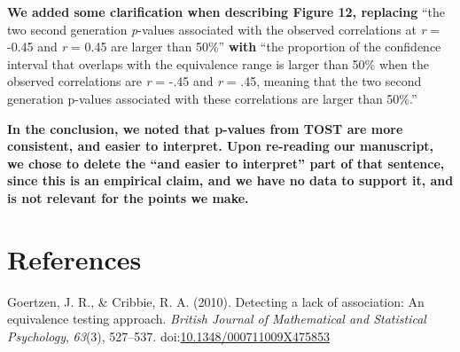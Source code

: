 \documentclass[man]{apa6}
\begin{document}
\textbf{We added some clarification when describing Figure 12, replacing} \enquote{the two second generation \emph{p}-values associated with the observed correlations at \emph{r} = -0.45 and \emph{r} = 0.45 are larger than 50\%} \textbf{with} \enquote{the proportion of the confidence interval that overlaps with the equivalence range is larger than 50\% when the observed correlations are \emph{r} = -.45 and \emph{r} = .45, meaning that the two second generation p-values associated with these correlations are larger than 50\%.}

\textbf{In the conclusion, we noted that p-values from TOST are more consistent, and easier to interpret. Upon re-reading our manuscript, we chose to delete the \enquote{and easier to interpret} part of that sentence, since this is an empirical claim, and we have no data to support it, and is not relevant for the points we make.}

\newpage

\hypertarget{references}{%
\section{References}\label{references}}

\begingroup
\setlength{\parindent}{-0.5in}
\setlength{\leftskip}{0.5in}

\hypertarget{refs}{}
\leavevmode\hypertarget{ref-goertzen_detecting_2010}{}%
Goertzen, J. R., \& Cribbie, R. A. (2010). Detecting a lack of association: An equivalence testing approach. \emph{British Journal of Mathematical and Statistical Psychology}, \emph{63}(3), 527--537. doi:\href{https://doi.org/10.1348/000711009X475853}{10.1348/000711009X475853}

\endgroup
\end{document}
